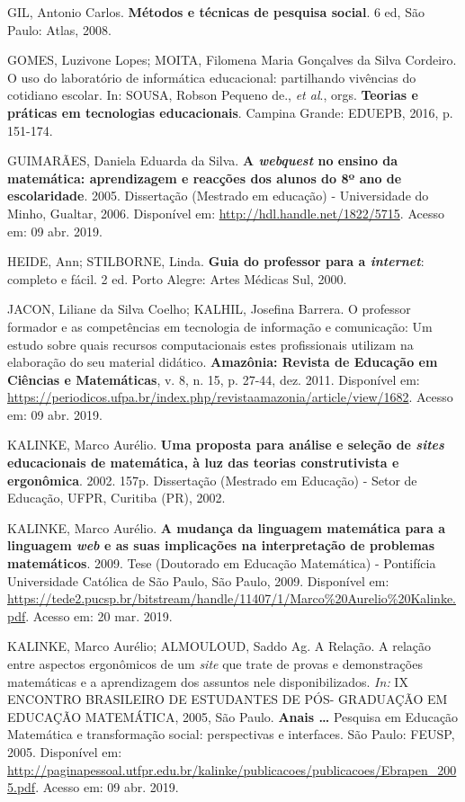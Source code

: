 \documentclass{IFNMG}
\begin{document}
\begin{Referencias}
	GIL, Antonio Carlos. \textbf{Métodos e técnicas de pesquisa social}. 6 ed, São Paulo: Atlas, 2008. 
	
	GOMES, Luzivone Lopes; MOITA, Filomena Maria Gonçalves da Silva Cordeiro. O uso do laboratório de informática educacional: partilhando vivências do cotidiano escolar. In: SOUSA, Robson Pequeno de., \textit{et al}., orgs. \textbf{Teorias e práticas em tecnologias educacionais}. Campina Grande: EDUEPB, 2016, p. 151-174.
	
	GUIMARÃES, Daniela Eduarda da Silva. \textbf{A \textit{webquest} no ensino da matemática: aprendizagem e reacções dos alunos do 8º ano de escolaridade}. 2005. Dissertação (Mestrado em educação) - Universidade do Minho, Gualtar, 2006. Disponível em: \url{http://hdl.handle.net/1822/5715}. Acesso em: 09 abr. 2019.
	
	HEIDE, Ann; STILBORNE, Linda. \textbf{Guia do professor para a \textit{internet}}: completo e fácil. 2 ed. Porto Alegre: Artes Médicas Sul, 2000. 
	
	JACON, Liliane da Silva Coelho; KALHIL, Josefina Barrera. O professor formador e as competências em tecnologia de informação e comunicação: Um estudo sobre quais recursos computacionais estes profissionais utilizam na elaboração do seu material didático. \textbf{Amazônia: Revista de Educação em Ciências e Matemáticas}, v. 8, n. 15, p. 27-44, dez. 2011. Disponível em: \url{https://periodicos.ufpa.br/index.php/revistaamazonia/article/view/1682}. Acesso em: 09 abr. 2019.
	
	KALINKE, Marco Aurélio. \textbf{Uma proposta para análise e seleção de \textit{sites} educacionais de matemática, à luz das teorias construtivista e ergonômica}. 2002. 157p. Dissertação (Mestrado em Educação) - Setor de Educação, UFPR, Curitiba (PR), 2002.
	
	KALINKE, Marco Aurélio. \textbf{A mudança da linguagem matemática para a linguagem \textit{web} e as suas implicações na interpretação de problemas matemáticos}. 2009. Tese (Doutorado em Educação Matemática) - Pontifícia Universidade Católica de São Paulo, São Paulo, 2009. Disponível em: \url{https://tede2.pucsp.br/bitstream/handle/11407/1/Marco\%20Aurelio\%20Kalinke.pdf}. Acesso em: 20 mar. 2019.
	
	KALINKE, Marco Aurélio; ALMOULOUD, Saddo Ag. A Relação.  A relação entre aspectos ergonômicos de um \textit{site} que trate de provas e demonstrações matemáticas e a aprendizagem dos assuntos nele disponibilizados. \textit{In:} IX ENCONTRO BRASILEIRO DE ESTUDANTES DE PÓS- GRADUAÇÃO EM EDUCAÇÃO MATEMÁTICA, 2005, São Paulo. \textbf{Anais …} Pesquisa em Educação Matemática e transformação social: perspectivas e interfaces. São Paulo: FEUSP, 2005. Disponível em: \url{http://paginapessoal.utfpr.edu.br/kalinke/publicacoes/publicacoes/Ebrapen_2005.pdf}. Acesso em: 09 abr. 2019.
	

\end{Referencias}
\end{document}
